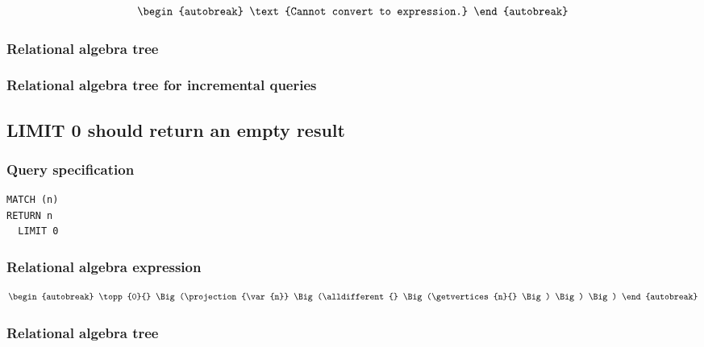\begin{align*}
\begin{autobreak}
\text{Cannot convert to expression.}
\end{autobreak}
\end{align*}

\subsubsection*{Relational algebra tree}


\subsubsection*{Relational algebra tree for incremental queries}


\subsection{LIMIT 0 should return an empty result}

\subsubsection*{Query specification}

\begin{lstlisting}
MATCH (n)
RETURN n
  LIMIT 0
\end{lstlisting}

\subsubsection*{Relational algebra expression}

\begin{align*}
\begin{autobreak}
\topp{0}{} \Big(\projection{\var{n}} \Big(\alldifferent{} \Big(\getvertices{n}{}
\Big)
\Big)
\Big)
\end{autobreak}
\end{align*}

\subsubsection*{Relational algebra tree}


